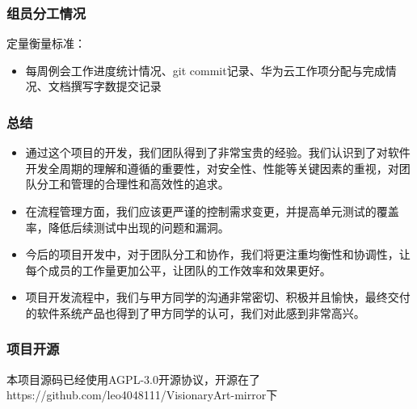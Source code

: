 \begin{frame}
    \frametitle{组员分工情况}
    \begin{table}[]
        \centering
        \caption{工作量表}
        \label{tab:tech-strategy}
    \end{table}
    定量衡量标准：
    \begin{itemize}
        \item 每周例会工作进度统计情况、git commit记录、华为云工作项分配与完成情况、文档撰写字数提交记录
    \end{itemize}
\end{frame}

\begin{frame}
    \frametitle{总结}
    \begin{itemize}
        \item 通过这个项目的开发，我们团队得到了非常宝贵的经验。我们认识到了对软件开发全周期的理解和遵循的重要性，对安全性、性能等关键因素的重视，对团队分工和管理的合理性和高效性的追求。
        \item 在流程管理方面，我们应该更严谨的控制需求变更，并提高单元测试的覆盖率，降低后续测试中出现的问题和漏洞。
        \item 今后的项目开发中，对于团队分工和协作，我们将更注重均衡性和协调性，让每个成员的工作量更加公平，让团队的工作效率和效果更好。
        \item 项目开发流程中，我们与甲方同学的沟通非常密切、积极并且愉快，最终交付的软件系统产品也得到了甲方同学的认可，我们对此感到非常高兴。
    \end{itemize}
\end{frame}

\begin{frame}
    \frametitle{项目开源}
    本项目源码已经使用{AGPL-3.0}开源协议，开源在了{https://github.com/leo4048111/VisionaryArt-mirror}下
\end{frame}

